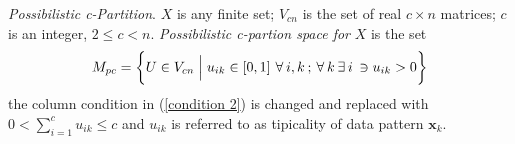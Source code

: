\begin{definition}\cite{pal2005possibilistic}
	\emph{Possibilistic c-Partition}\label{def:Possibilistic c-Partition}.\hspace{2pt} $ X $ \hspace{2pt}is any finite set;\hspace{2pt} $V_{cn}$ is the set of real\hspace{2pt} $c\times n$\hspace{2pt} matrices;\hspace{2pt} $c$\hspace{2pt} is an integer,\hspace{2pt} $2\leq c< n$.\hspace{2pt} \emph{Possibilistic c-partion space for}\hspace{2pt} $X$\hspace{2pt} is the set	
	\begin{equation}\label{Possibilistic set space}
		M_{pc}= \bigg\{ U\in V_{cn}\Bigm| u_{ik}\in \left[ 0,1\right] \hspace{2pt} \forall\hspace{2pt} i,k\hspace{2pt} ;\hspace{2pt} \forall \hspace{2pt}k\hspace{2pt} \exists\hspace{2pt} i \hspace{2pt}\ni u_{ik}> 0\bigg\}
	\end{equation}
	the column condition in (\ref{condition 2}) is changed and replaced with\hspace{2pt} $0<\sum_{i=1}^{c} u_{ik}\leq c$\hspace{2pt} and\hspace{2pt} $u_{ik}$\hspace{2pt} is referred to as tipicality of data pattern\hspace{2pt} $\mathbf{x}_k$\cite{krishnapuram1993possibilistic}.
	
\end{definition}